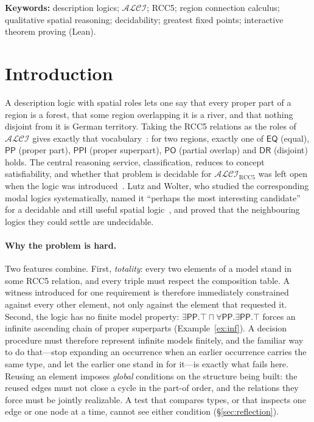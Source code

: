 \documentclass[11pt]{article}
\newcommand{\ALCIRCC}[1]{\mathcal{ALCI}_{\mathrm{RCC#1}}}
\newcommand{\ALCI}{\ensuremath{\mathcal{ALCI}}}
\newcommand{\DR}{\mathsf{DR}}
\newcommand{\PO}{\mathsf{PO}}
\newcommand{\PP}{\mathsf{PP}}
\newcommand{\PPI}{\mathsf{PPI}}
\newcommand{\EQ}{\mathsf{EQ}}
\theoremstyle{plain}
\theoremstyle{definition}
\begin{document}
\medskip
\noindent\textbf{Keywords:} description logics; $\ALCI$; RCC5; region
connection calculus; qualitative spatial reasoning; decidability; greatest
fixed points; interactive theorem proving (Lean).

\tableofcontents

\section{Introduction}
\label{sec:intro}

A description logic with spatial roles lets one say that every proper part of
a region is a forest, that some region overlapping it is a river, and that
nothing disjoint from it is German territory. Taking the RCC5 relations as the
roles of $\ALCI$ gives exactly that vocabulary~\cite{Cohn1993,Wessel2003}:
for two regions, exactly one of $\EQ$ (equal), $\PP$ (proper part), $\PPI$
(proper superpart), $\PO$ (partial overlap) and $\DR$ (disjoint) holds. The
central reasoning service, classification, reduces to concept satisfiability,
and whether that problem is decidable for $\ALCIRCC{5}$ was left open when the
logic was introduced~\cite{Wessel2003}. Lutz and Wolter, who studied the
corresponding modal logics systematically, named it ``perhaps the most
interesting candidate'' for a decidable and still useful spatial
logic~\cite{LutzWolter2006}, and proved that the neighbouring logics they
could settle are undecidable.

\paragraph{Why the problem is hard.} Two features combine. First,
\emph{totality}: every two elements of a model stand in some RCC5 relation,
and every triple must respect the composition table. A witness introduced for
one requirement is therefore immediately constrained against every other
element, not only against the element that requested it. Second, the logic has
no finite model property: $\exists\PP.\top\sqcap\forall\PP.\exists\PP.\top$
forces an infinite ascending chain of proper superparts
(Example~\ref{ex:inf}). A decision
procedure must therefore represent infinite models finitely, and the familiar
way to do that---stop expanding an occurrence when an earlier occurrence
carries the same type, and let the earlier one stand in for it---is exactly
what fails here. Reusing an element imposes \emph{global} conditions on the
structure being built: the reused edges must not close a cycle in the part-of
order, and the relations they force must be jointly realizable. A test that
compares types, or that inspects one edge or one node at a time, cannot see
either condition (\S\ref{sec:reflection}).
\end{document}
